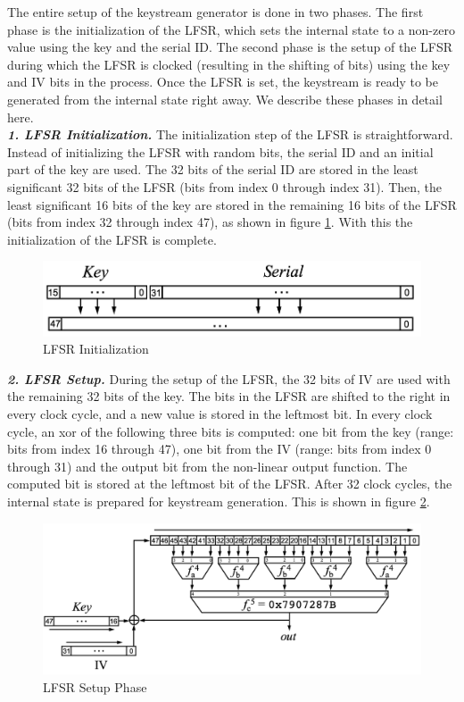 The entire setup of the keystream generator is done in two phases. The first phase is the initialization of the LFSR, which sets the internal state to a non-zero value using the key and the serial ID. The second phase is the setup of the LFSR during which the LFSR is clocked (resulting in the shifting of bits) using the key and IV bits in the process. Once the LFSR is set, the keystream is ready to be generated from the internal state right away. We describe these phases in detail here.\\ 

\noindent \textit{\textbf{1. LFSR Initialization.}} The initialization step of the LFSR is straightforward. Instead of initializing the LFSR with random bits, the serial ID and an initial part of the key are used. The 32 bits of the serial ID are stored in the least significant 32 bits of the LFSR (bits from index 0 through index 31). Then, the least significant 16 bits of the key are stored in the remaining 16 bits of the LFSR (bits from index 32 through index 47), as shown in figure \ref{fig:hitag2-1}. With this the initialization of the LFSR is complete.\\

\begin{figure}[ht!]
	\centering
		\includegraphics[width=5in]{./figures/hitag2-1.PNG}
	\caption{LFSR Initialization}	
	\label{fig:hitag2-1}
\end{figure}

\noindent \textit{\textbf{2. LFSR Setup.}} During the setup of the LFSR, the 32 bits of IV are used with the remaining 32 bits of the key. The bits in the LFSR are shifted to the right in every clock cycle, and a new value is stored in the leftmost bit. In every clock cycle, an xor of the following three bits is computed: one bit from the key (range: bits from index 16 through 47), one bit from the IV (range: bits from index 0 through 31) and the output bit from the non-linear output function. The computed bit is stored at the leftmost bit of the LFSR. After 32 clock cycles, the internal state is prepared for keystream generation. This is shown in figure \ref{fig:hitag2-2}.\\

\begin{figure}[ht!]
	\centering
		\includegraphics[width=5.5in]{./figures/hitag2-2.PNG}
	\caption{LFSR Setup Phase}	
	\label{fig:hitag2-2}
\end{figure}

